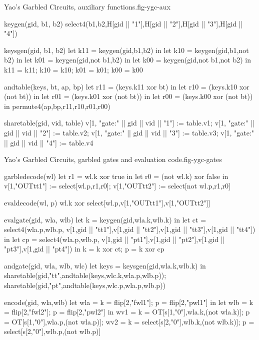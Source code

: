 \begin{fpfig}[t]{Yao's Garbled Circuits, auxiliary functions.}{fig-ygc-aux}
{\footnotesize
\begin{verbatimtab}
  keygen(gid, b1, b2) { select4(b1,b2,H[gid || "1"],H[gid || "2"],H[gid || "3"],H[gid || "4"]) }
  
  keysgen(gid, b1, b2)
  {
    let k11 = keygen(gid,b1,b2) in
    let k10 = keygen(gid,b1,not b2) in
    let k01 = keygen(gid,not b1,b2) in
    let k00 = keygen(gid,not b1,not b2) in
    {k11 = k11; k10 = k10; k01 = k01; k00 = k00}
  }
  
  andtable(keys, bt, ap, bp)
  {
    let r11 = (keys.k11 xor bt) in 
    let r10 = (keys.k10 xor (not bt)) in
    let r01 = (keys.k01 xor (not bt)) in
    let r00 = (keys.k00 xor (not bt)) in
    permute4(ap,bp,r11,r10,r01,r00)
  }
  
  sharetable(gid, vid, table)
  {   
    v[1, "gate:" || gid || vid || "1"] := table.v1;
    v[1, "gate:" || gid || vid || "2"] := table.v2;
    v[1, "gate:" || gid || vid || "3"] := table.v3;
    v[1, "gate:" || gid || vid || "4"] := table.v4
  }
\end{verbatimtab}
}
\end{fpfig}

\begin{fpfig}[t]{Yao's Garbled Circuits, garbled gates and evaluation code.}{fig-ygc-gates}
{\footnotesize
\begin{verbatimtab}
  garbledecode(wl)
  {
    let r1 = wl.k xor true in
    let r0 = (not wl.k) xor false in
    v[1,"OUTtt1"] := select[wl.p,r1,r0];
    v[1,"OUTtt2"] := select[not wl.p,r1,r0]
  }
  
  evaldecode(wl, p) { wl.k xor select[wl.p,v[1,"OUTtt1"],v[1,"OUTtt2"]] }
  
  evalgate(gid, wla, wlb)
  {
    let k = keygen(gid,wla.k,wlb.k) in
    let ct = select4(wla.p,wlb.p,
               v[1,gid || "tt1"],v[1,gid || "tt2"],v[1,gid || "tt3"],v[1,gid || "tt4"]) in
    let cp = select4(wla.p,wlb.p,
               v[1,gid || "pt1"],v[1,gid || "pt2"],v[1,gid || "pt3"],v[1,gid || "pt4"]) in
    { k = k xor ct; p = k xor cp }
  }
  
  andgate(gid, wla, wlb, wlc) 
  {
    let keys = keysgen(gid,wla.k,wlb.k) in
    sharetable(gid,"tt",andtable(keys,wlc.k,wla.p,wlb.p));
    sharetable(gid,"pt",andtable(keys,wlc.p,wla.p,wlb.p))
  }
  
  encode(gid, wla,wlb)
  {
    let wla = { k = flip[2,"fwl1"]; p = flip[2,"pwl1"] } in
    let wlb = { k = flip[2,"fwl2"]; p = flip[2,"pwl2"] } in
    { wv1 = { k = OT[s[1,"0"],wla.k,(not wla.k)]; p = OT[s[1,"0"],wla.p,(not wla.p)]}; 
      wv2 = { k = select[s[2,"0"],wlb.k,(not wlb.k)]; p = select[s[2,"0"],wlb.p,(not wlb.p)] } }
  }
\end{verbatimtab}
}
\end{fpfig}

